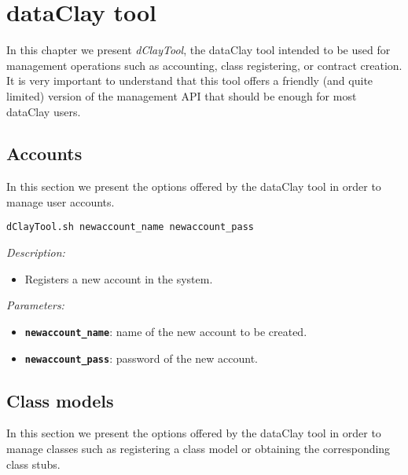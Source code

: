 
\chapter{dataClay tool}
\label{sec:dClayTool}

In this chapter we present \textit{dClayTool}, the dataClay tool intended to be used for management operations such as accounting, class registering, or contract creation. It is very important to understand that this tool offers a friendly (and quite limited) version of the management API that should be enough for most dataClay users. 

\section{Accounts}

In this section we present the options offered by the dataClay tool in order to manage user accounts.


\begin{dBox}
\texttt{dClayTool.sh  newaccount\_name newaccount\_pass}
\LINE

{\it Description:}

\begin{itemize}
    \item Registers a new account in the system.
\end{itemize}

{\it Parameters:}

\begin{itemize}
    \item \texttt{\bfseries newaccount\_name}: name of the new account to be created.
    \item \texttt{\bfseries newaccount\_pass}: password of the new account.
\end{itemize}
 
\end{dBox}

\section{Class models}
\label{sec:newModel}

In this section we present the options offered by the dataClay tool in order to manage classes such as registering a class model or obtaining the corresponding class stubs.

